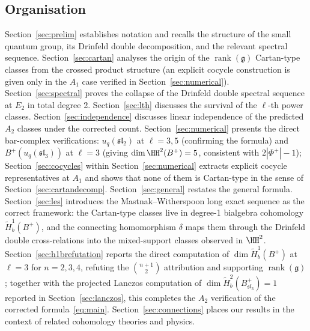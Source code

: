 \subsection{Organisation}

Section~\ref{sec:prelim} establishes notation and recalls the structure of the small quantum group, its Drinfeld double decomposition, and the relevant spectral sequence. Section~\ref{sec:cartan} analyses the origin of the $\operatorname{rank}(\mathfrak{g})$ Cartan-type classes from the crossed product structure (an explicit cocycle construction is given only in the $A_1$ case verified in Section~\ref{sec:numerical}). Section~\ref{sec:spectral} proves the collapse of the Drinfeld double spectral sequence at $E_2$ in total degree 2. Section~\ref{sec:lth} discusses the survival of the $\ell$-th power classes. Section~\ref{sec:independence} discusses linear independence of the predicted $A_2$ classes under the corrected count. Section~\ref{sec:numerical} presents the direct bar-complex verifications: $u_q(\mathfrak{sl}_2)$ at $\ell = 3, 5$ (confirming the formula) and $B^+(u_q(\mathfrak{sl}_3))$ at $\ell = 3$ (giving $\dim \HH^2(B^+) = 5$, consistent with $2|\Phi^+| - 1$); Section~\ref{sec:cocycles} within Section~\ref{sec:numerical} extracts explicit cocycle representatives at $A_1$ and shows that none of them is Cartan-type in the sense of Section~\ref{sec:cartandecomp}. Section~\ref{sec:general} restates the general formula. Section~\ref{sec:les} introduces the Mastnak--Witherspoon long exact sequence as the correct framework: the Cartan-type classes live in degree-1 bialgebra cohomology $\tilde{H}^1_b(B^+)$, and the connecting homomorphism $\delta$ maps them through the Drinfeld double cross-relations into the mixed-support classes observed in $\HH^2$. Section~\ref{sec:h1brefutation} reports the direct computation of $\dim \tilde{H}^1_b(B^+)$ at $\ell = 3$ for $n = 2, 3, 4$, refuting the $\binom{n+1}{2}$ attribution and supporting $\operatorname{rank}(\mathfrak{g})$; together with the projected Lanczos computation of $\dim \tilde{H}^2_b(B^+_{\mathfrak{sl}_3}) = 1$ reported in Section~\ref{sec:lanczos}, this completes the $A_2$ verification of the corrected formula~\eqref{eq:main}. Section~\ref{sec:connections} places our results in the context of related cohomology theories and physics.
